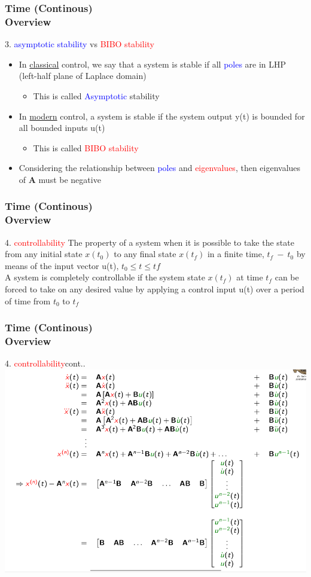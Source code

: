 \documentclass[hyperref={pdfpagelabels=true}]{beamer}
\begin{document}
\begin{frame}
\frametitle{Time (Continous) \\ {\large Overview}}
3. \textcolor{blue}{asymptotic stability} vs \textcolor{red}{BIBO stability} \\ \vfill \vfill
\begin{itemize}
\item In \underline{classical} control, we say that a system is stable if
all \textcolor{blue}{poles} are in LHP (left-half plane of Laplace domain)
   \begin{itemize}
   \item This is called \textcolor{blue}{Asymptotic} stability
   \end{itemize}
\item In \underline{modern} control, a system is stable if the system
output y(t) is bounded for all bounded inputs u(t)
    \begin{itemize} 
    \item This is called \textcolor{red}{BIBO stability}
    \end{itemize}
\item Considering the relationship between \textcolor{blue}{poles} and
\textcolor{red}{eigenvalues}, then eigenvalues of {\bf A} must be
negative
\end{itemize}
\end{frame}

\begin{frame}
\frametitle{Time (Continous) \\ {\large Overview}}
4. \textcolor{red}{controllability}
\vfill \small{
The property of a system when it is possible to take the state from any
initial state $x(t_0)$ to any final state $x(t_f)$ in a finite time, $t_f \ - \ t_0$ by
means of the input vector u(t), $t_0 \le t \le t f$ \\ \vfill
A system is completely controllable if the system state $x(t_f)$ at time $t_f$
can be forced to take on any desired value by applying a control input
u(t) over a period of time from $t_0$ to $t_f$}
\end{frame}

\begin{frame}
\frametitle{Time (Continous) \\ {\large Overview}}
4. \textcolor{red}{controllability}{\tiny cont..}
\includegraphics[scale = .328]{figs/Selection_048.png}
\end{frame}
\end{document}
